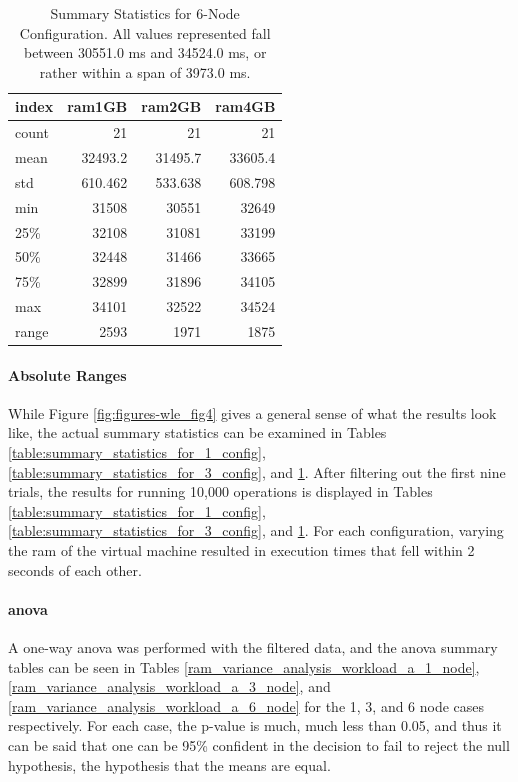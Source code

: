 \begin{table}
\begin{tabular}{lrrr}
\toprule
 index &  ram1GB &  ram2GB &  ram4GB \\
\midrule
 count &      21 &      21 &      21 \\
  mean & 32493.2 & 31495.7 & 33605.4 \\
   std & 610.462 & 533.638 & 608.798 \\
   min &   31508 &   30551 &   32649 \\
   25\% &   32108 &   31081 &   33199 \\
   50\% &   32448 &   31466 &   33665 \\
   75\% &   32899 &   31896 &   34105 \\
   max &   34101 &   32522 &   34524 \\
 range &    2593 &    1971 &    1875 \\
\bottomrule
\end{tabular}
\caption{Summary Statistics for 6-Node Configuration. All values represented fall between 30551.0 ms and 34524.0 ms, or rather within a span of 3973.0 ms.}
\label{table:summary_statistics_for_6_config}
\end{table}

\paragraph{Absolute Ranges}

While Figure \ref{fig:figures-wle_fig4} gives a general sense of what the results look like, the actual summary statistics can be examined in Tables \ref{table:summary_statistics_for_1_config}, \ref{table:summary_statistics_for_3_config}, and \ref{table:summary_statistics_for_6_config}. After filtering out the first nine trials, the results for running 10,000 operations is displayed in Tables \ref{table:summary_statistics_for_1_config}, \ref{table:summary_statistics_for_3_config}, and \ref{table:summary_statistics_for_6_config}.  For each configuration, varying the \gls{ram} of the virtual machine resulted in execution times that fell within 2 seconds of each other.

\paragraph{\gls{anova}}

A one-way \gls{anova} was performed with the filtered data, and the \gls{anova} summary tables can be seen in Tables \ref{ram_variance_analysis_workload_a_1_node}, \ref{ram_variance_analysis_workload_a_3_node}, and \ref{ram_variance_analysis_workload_a_6_node} for the 1, 3, and 6 node cases respectively.  For each case, the  p-value is much, much less than 0.05, and thus it can be said that one can be 95\% confident in the decision to fail to reject the null hypothesis, the hypothesis that the means are equal.

